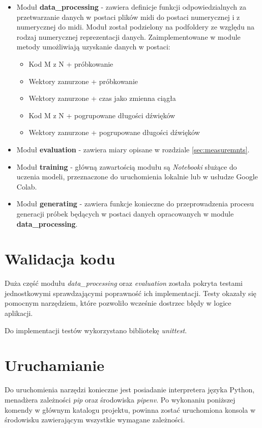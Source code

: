 {{        \begin{itemize}
            \setlength\itemsep{-0.5em}
            \item Moduł {\textbf {data\_processing}} - zawiera definicje funkcji odpowiedzialnych za przetwarzanie danych w postaci plików midi do postaci numerycznej i z numerycznej do midi. Moduł został podzielony na podfoldery ze względu na rodzaj numerycznej reprezentacji danych. Zaimplementowane w module metody umożliwiają uzyskanie danych w postaci:
            \begin{itemize}
                \setlength\itemsep{-0.5em}
                \item Kod  M\,\,z\,\,N + próbkowanie
                \item Wektory zanurzone + próbkowanie
                \item Wektory zanurzone + czas jako zmienna ciągła
                \item Kod  M\,\,z\,\,N + pogrupowane długości dźwięków
                \item Wektory zanurzone + pogrupowane długości dźwięków
            \end{itemize}
            \item Moduł {\textbf {evaluation}} - zawiera miary opisane w rozdziale \ref{sec:measuremnts}.
            \item Moduł {\textbf {training}} - główną zawartością modułu są {\textit {Notebooki}} służące do uczenia modeli, przeznaczone do uruchomienia lokalnie lub w usłudze Google Colab.
            \item Moduł {\textbf {generating}} - zawiera funkcje konieczne do przeprowadzenia procesu generacji próbek będących w postaci danych opracowanych w module \\ {\textbf {data\_processing}}.
        \end{itemize}
    }

    \section{Walidacja kodu}
    {
        Duża część modułu {\textit {data\_processing}} oraz {\textit {evaluation}} została pokryta testami jednostkowymi sprawdzającymi poprawność ich implementacji. 
        Testy okazały się pomocnym narzędziem, które pozwoliło wcześnie dostrzec błędy w logice aplikacji.

        Do implementacji testów wykorzystano bibliotekę {\textit {unittest}}.
    }

    \section{Uruchamianie}
    {
        Do uruchomienia narzędzi konieczne jest posiadanie interpretera języka Python, menadżera zależności {\textit {pip}} oraz środowiska {\textit {pipenv}}. Po wykonaniu poniższej komendy w głównym katalogu projektu, powinna zostać uruchomiona konsola w środowisku zawierającym wszystkie wymagane zależności.

}}
